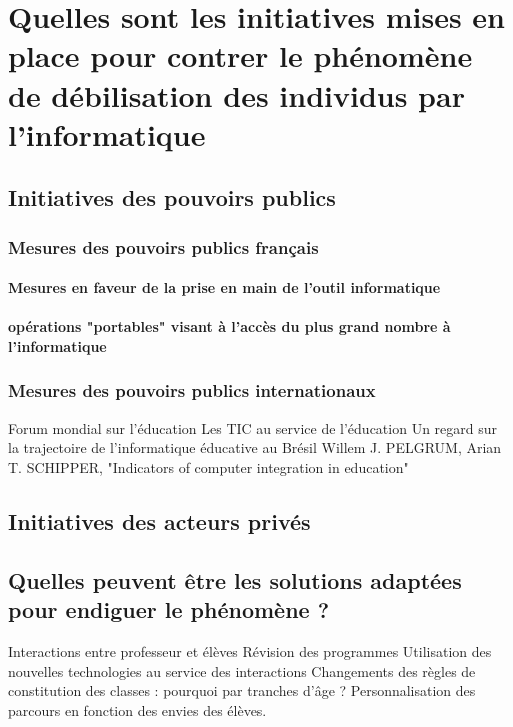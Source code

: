 
\chapter{Quelles sont les initiatives mises en place pour contrer le phénomène de débilisation des individus par l'informatique}\label{initiatives_actuelles}

\section{Initiatives des pouvoirs publics}

\subsection{Mesures des pouvoirs publics français}
\subsubsection{Mesures en faveur de la prise en main de l'outil informatique}
\cite{b2i_c2i}
\cite{b2i}
\cite{isn}

\subsubsection{opérations "portables" visant à l'accès du plus grand nombre à l'informatique}
\cite{portables35}
\cite{portables60}
\cite{portables40}

    


\subsection{Mesures des pouvoirs publics internationaux}
Forum mondial sur l’éducation \cite{educ_forum}
Les TIC au service de l’éducation \cite{tics}
Un regard sur la trajectoire de l’informatique éducative au Brésil \cite{peixoto2006regard}
Willem J. PELGRUM, Arian T. SCHIPPER, "Indicators of computer integration in education" \cite{pelgrum1993indicators}



\section{Initiatives des acteurs privés}



\section{Quelles peuvent être les solutions adaptées pour endiguer le phénomène ?}\label{solutions}

Interactions entre professeur et élèves
Révision des programmes
Utilisation des nouvelles technologies au service des interactions
Changements des règles de constitution des classes : pourquoi par tranches d'âge ?
Personnalisation des parcours en fonction des envies des élèves.


